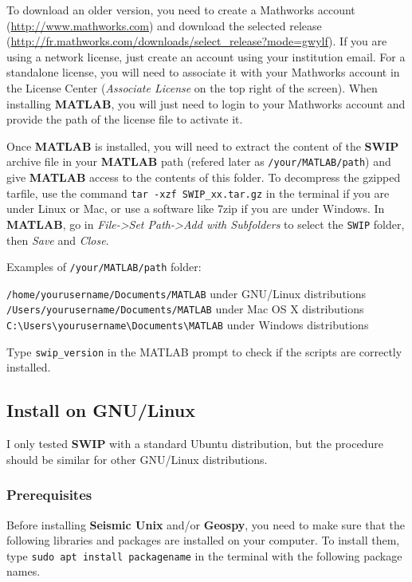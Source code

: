 \documentclass[twoside,a4paper]{article}
\def\SWIP{\textbf{SWIP}}
\def\SeismicUnix{\textbf{Seismic Unix}}
\def\Geopsy{\textbf{Geospy}}
\def\MATLAB{\textbf{MATLAB}}
\begin{document}
To download an older version, you need to create a Mathworks account (\url{http://www.mathworks.com}) and download the selected release (\url{http://fr.mathworks.com/downloads/select_release?mode=gwylf}). If you are using a network license, just create an account using your institution email. For a standalone license, you will need to associate it with your Mathworks account in the License Center (\textit{Associate License} on the top right of the screen). When installing {\MATLAB}, you will just need to login to your Mathworks account and provide the path of the license file to activate it.

Once {\MATLAB} is installed, you will need to extract the content of the {\SWIP} archive file in your {\MATLAB} path (refered later as \verb|/your/MATLAB/path|) and give {\MATLAB} access to the contents of this folder. To decompress the gzipped tarfile, use the command \verb|tar -xzf SWIP_xx.tar.gz| in the terminal if you are under Linux or Mac, or use a software like 7zip if you are under Windows. In {\MATLAB}, go in \textit{File->Set Path->Add with Subfolders} to select the \verb|SWIP| folder, then \textit{Save} and \textit{Close}.

Examples of \verb|/your/MATLAB/path| folder:

\verb|/home/yourusername/Documents/MATLAB| under GNU/Linux distributions\\
\verb|/Users/yourusername/Documents/MATLAB| under Mac OS X distributions\\
\verb|C:\Users\yourusername\Documents\MATLAB| under Windows distributions

Type \verb|swip_version| in the MATLAB prompt to check if the scripts are correctly installed.

\clearpage
\subsection{Install on GNU/Linux}
I only tested {\SWIP} with a standard Ubuntu distribution, but the procedure should be similar for other GNU/Linux distributions.
\subsubsection{Prerequisites}
Before installing {\SeismicUnix} and/or {\Geopsy}, you need to make sure that the following libraries and packages are installed on your computer. To install them, type \verb|sudo apt install packagename| in the terminal with the following package names.
\end{document}
